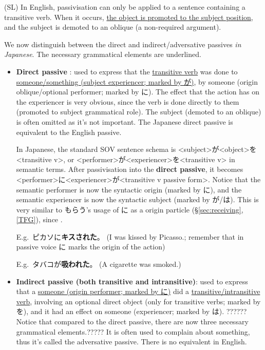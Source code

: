 \documentclass[../nihongo-gakushuu-kyouzai.tex]{subfiles}
\begin{document}
(SL) In English, passivisation can only be applied to a sentence containing a transitive verb. When it occurs, \ul{the object is promoted to the subject position}, and the subject is demoted to an oblique (a non-required argument).


We now distinguish between the direct and indirect/adversative passives \emph{in Japanese}. The necessary grammatical elements are underlined.
\begin{itemize}
    \item \textbf{Direct passive }: used to express that the \ul{transitive verb} was done to \ul{someone/something (subject experiencer; marked by が)}, by someone (origin oblique/optional performer; marked by に). The effect that the action has on the experiencer is very obvious, since the verb is done directly to them (promoted to subject grammatical role). The subject (demoted to an oblique) is often omitted as it's not important. The Japanese direct passive is equivalent to the English passive.

    In Japanese, the standard SOV sentence schema is <subject>が<object>を<transitive v>, or <performer>が<experiencer>を<transitive v> in semantic terms. After passivisation into the \textbf{direct passive}, it becomes <performer>に<experiencer>が<transitive v passive form>. Notice that the semantic performer is now the syntactic origin (marked by に), and the semantic experiencer is now the syntactic subject (marked by が/は). This is very similar to もらう's usage of に as a origin particle (\S\ref{sec:receiving}, \href{https://www.tofugu.com/japanese-grammar/particle-ni/\#in-social-interactions-and-transactions}{[TFG]}), since .

    E.g.\ ピカソに\textbf{キスされた}。 (I was kissed by Picasso.; remember that in passive voice に marks the origin of the action)

    E.g.\ タバコが\textbf{吸われた}。 (A cigarette was smoked.)

    \item \textbf{Indirect passive (both transitive and intransitive)}: used to express that a \ul{someone (origin performer; marked by に)} did a \ul{transitive/intransitive verb}, involving an optional direct object (only for transitive verbs; marked by を), and it had an effect on someone (experiencer; marked by は). ??????Notice that compared to the direct passive, there are now three necessary grammatical elements.????? It is often used to complain about something, thus it's called the adversative passive. There is no equivalent in English.


\end{itemize}
\end{document}
